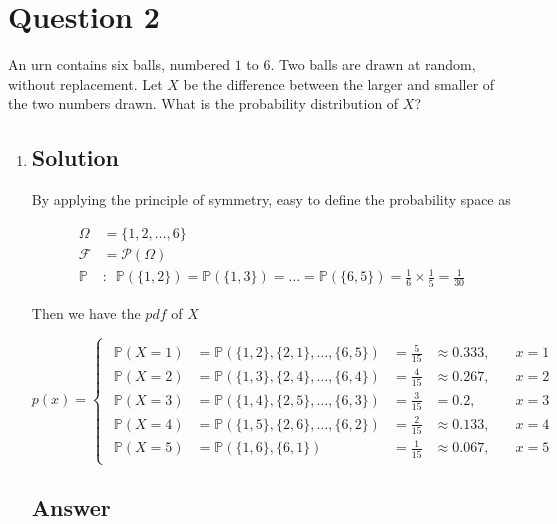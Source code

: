 \documentclass[12pt]{article}
\newcommand{\bP}{\mathbb{P}}
\begin{document}
	
	\section*{Question 2}
	
	\noindent An urn contains six balls, numbered $1$ to $6$. Two balls are drawn at random, without replacement. Let $X$ be the difference between the larger and smaller of the two numbers drawn. What is the probability distribution of $X$?
	
	\bigskip
	
	\begin{enumerate}[label={},leftmargin=0in]\item
		\subsection*{Solution}
		
			By applying the principle of symmetry, easy to define the probability space as
			
			\[
			\begin{aligned}
				\Omega &= \{1,2,\dots,6\}\\
				\mathcal{F} &= \mathcal{P}(\Omega)\\
				\bP &:\enspace \bP(\{1,2\}) = \bP(\{1,3\}) = \dots = \bP(\{6,5\}) = \frac{1}{6}\times \frac{1}{5} = \frac{1}{30}
			\end{aligned}
			\]
			
			Then we have the $pdf$ of $X$
			
			\[
				p(x) =
				\begin{cases}
					\begin{aligned}
						\bP(X = 1) &= \bP(\{1,2\},\{2,1\},\dots,\{6,5\}) &= \frac{5}{15} &\approx 0.333,&\quad x = 1\\
						\bP(X = 2) &= \bP(\{1,3\},\{2,4\},\dots,\{6,4\}) &= \frac{4}{15} &\approx 0.267,&\quad x = 2\\
						\bP(X = 3) &= \bP(\{1,4\},\{2,5\},\dots,\{6,3\}) &= \frac{3}{15} &= 0.2,&\quad x = 3\\
						\bP(X = 4) &= \bP(\{1,5\},\{2,6\},\dots,\{6,2\}) &= \frac{2}{15} &\approx 0.133,&\quad x = 4\\
						\bP(X = 5) &= \bP(\{1,6\},\{6,1\}) &= \frac{1}{15} &\approx 0.067,&\quad x = 5
					\end{aligned}
				\end{cases}
			\]
		
		\subsection*{Answer}
		

\end{enumerate}
\end{document}
